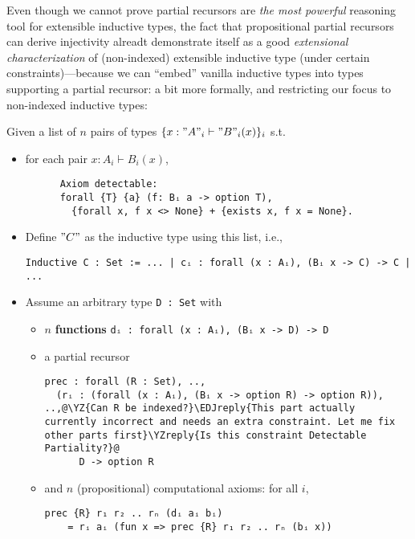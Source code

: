 Even though we cannot prove partial recursors are \textit{the
most powerful} reasoning tool for extensible inductive types,
the fact that propositional partial
recursors can derive injectivity alreadt demonstrate itself as a good \textit{extensional characterization} of
(non-indexed) extensible inductive type (under certain
constraints)---because we can ``embed'' vanilla inductive types into
types supporting a partial recursor: a bit more formally, and
restricting our focus to non-indexed inductive types:

\begin{theorem}\label{thm:prec-complete} Given a list of $n$ pairs of types $\{ x : "A"_i \vdash "B"_i(x) \}_{i}$ s.t.


  \begin{itemize}
    \item {} for each pair $x : A_i \vdash B_i(x)$,
    \begin{verbatim}
      Axiom detectable:
      forall {T} {a} (f: Bᵢ a -> option T),
        {forall x, f x <> None} + {exists x, f x = None}.
    \end{verbatim} 
    \item Define $"C"$ as the inductive type using this list, i.e.,
    \begin{verbatim}
Inductive C : Set := ... | cᵢ : forall (x : Aᵢ), (Bᵢ x -> C) -> C | ...
    \end{verbatim}
    \item Assume an arbitrary type \texttt{D : Set} with
    \begin{itemize}
      \item $n$ \textbf{functions} \texttt{dᵢ : forall (x : Aᵢ), (Bᵢ x -> D) -> D}  
      \item a partial recursor
      \begin{verbatim}
prec : forall (R : Set), ..,
  (rᵢ : (forall (x : Aᵢ), (Bᵢ x -> option R) -> option R)), ..,@\YZ{Can R be indexed?}\EDJreply{This part actually currently incorrect and needs an extra constraint. Let me fix other parts first}\YZreply{Is this constraint Detectable Partiality?}@
      D -> option R
      \end{verbatim}
      \item and $n$ (propositional) computational axioms: for all $i$, 
      \begin{verbatim}
prec {R} r₁ r₂ .. rₙ (dᵢ aᵢ bᵢ) 
    = rᵢ aᵢ (fun x => prec {R} r₁ r₂ .. rₙ (bᵢ x))
      \end{verbatim}

\end{itemize}
\end{itemize}
\end{theorem}
